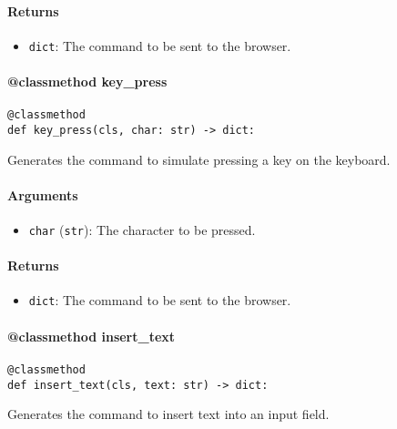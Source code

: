 \documentclass{article}
\begin{document}
\paragraph{Returns}

\begin{itemize}
    \item \lstinline[style=pythonstyle]|dict|: The command to be sent to the browser.
\end{itemize}

\paragraph{@classmethod key\_press}

\begin{lstlisting}[style=pythonstyle]
@classmethod
def key_press(cls, char: str) -> dict:
\end{lstlisting}

\noindent Generates the command to simulate pressing a key on the keyboard.

\paragraph{Arguments}

\begin{itemize}
    \item \lstinline[style=pythonstyle]|char| (\lstinline[style=pythonstyle]|str|): The character to be pressed.
\end{itemize}

\paragraph{Returns}

\begin{itemize}
    \item \lstinline[style=pythonstyle]|dict|: The command to be sent to the browser.
\end{itemize}

\paragraph{@classmethod insert\_text}

\begin{lstlisting}[style=pythonstyle]
@classmethod
def insert_text(cls, text: str) -> dict:
\end{lstlisting}

\noindent Generates the command to insert text into an input field.
\end{document}
